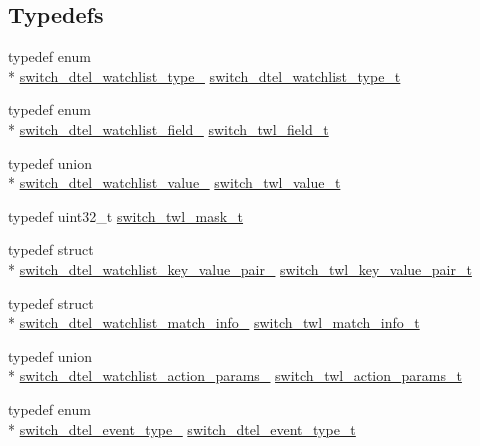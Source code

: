 \subsection*{Typedefs}
\begin{DoxyCompactItemize}
\item 
typedef enum \\*
\hyperlink{group__DTel_ga2aef2de534e989fcfd03b3afede795f7}{switch\+\_\+dtel\+\_\+watchlist\+\_\+type\+\_\+} \hyperlink{group__DTel_ga4ab4177e5628351a6074dfbaee9c5857}{switch\+\_\+dtel\+\_\+watchlist\+\_\+type\+\_\+t}
\item 
typedef enum \\*
\hyperlink{group__DTel_gac1ac564283da72d8f9315c73246d73a7}{switch\+\_\+dtel\+\_\+watchlist\+\_\+field\+\_\+} \hyperlink{group__DTel_gabf1727b3b95e347527f21edc4d190da3}{switch\+\_\+twl\+\_\+field\+\_\+t}
\item 
typedef union \\*
\hyperlink{unionswitch__dtel__watchlist__value__}{switch\+\_\+dtel\+\_\+watchlist\+\_\+value\+\_\+} \hyperlink{group__DTel_ga7a0ef1d328d3dff99e1d4ad961691b78}{switch\+\_\+twl\+\_\+value\+\_\+t}
\item 
typedef uint32\+\_\+t \hyperlink{group__DTel_ga2d24f83795fcb9f29c85153777c47d8f}{switch\+\_\+twl\+\_\+mask\+\_\+t}
\item 
typedef struct \\*
\hyperlink{structswitch__dtel__watchlist__key__value__pair__}{switch\+\_\+dtel\+\_\+watchlist\+\_\+key\+\_\+value\+\_\+pair\+\_\+} \hyperlink{group__DTel_ga32b4f5a66b9bce81be295a7388eadb04}{switch\+\_\+twl\+\_\+key\+\_\+value\+\_\+pair\+\_\+t}
\item 
typedef struct \\*
\hyperlink{structswitch__dtel__watchlist__match__info__}{switch\+\_\+dtel\+\_\+watchlist\+\_\+match\+\_\+info\+\_\+} \hyperlink{group__DTel_gaf669663e566583a08f1b606876efa9e6}{switch\+\_\+twl\+\_\+match\+\_\+info\+\_\+t}
\item 
typedef union \\*
\hyperlink{unionswitch__dtel__watchlist__action__params__}{switch\+\_\+dtel\+\_\+watchlist\+\_\+action\+\_\+params\+\_\+} \hyperlink{group__DTel_ga8cce873b25ed2712f3fca9f1c43ca52a}{switch\+\_\+twl\+\_\+action\+\_\+params\+\_\+t}
\item 
typedef enum \\*
\hyperlink{group__DTel_gad4cfb745b37be86549050bcd8c3166c0}{switch\+\_\+dtel\+\_\+event\+\_\+type\+\_\+} \hyperlink{group__DTel_ga093c7c7db287f39a58d5b3ec66bf15ec}{switch\+\_\+dtel\+\_\+event\+\_\+type\+\_\+t}
\end{DoxyCompactItemize}
